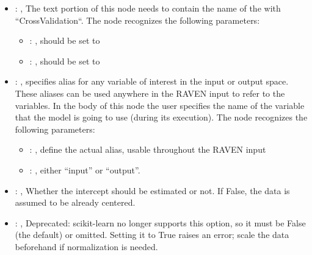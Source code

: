 \begin{itemize}
\begin{itemize}
        \item {}: ,
          List of IDs of features/variables to include in the transformation process.

        \item {}: ,
          Which space to search? Target or Feature?
      \end{itemize}

    \item {}: ,
      The text portion of this node needs to contain the name of the  with
               ``CrossValidation``.
      The  node recognizes the following parameters:
        \begin{itemize}
          \item {}: ,
            should be set to 
          \item {}: ,
            should be set to 
      \end{itemize}

    \item {}: ,
      specifies alias for         any variable of interest in the input or output space. These
      aliases can be used anywhere in the RAVEN input to         refer to the variables. In the body
      of this node the user specifies the name of the variable that the model is going to use
      (during its execution).
      The  node recognizes the following parameters:
        \begin{itemize}
          \item {}: ,
            define the actual alias, usable throughout the RAVEN input
          \item {}: ,
            either ``input'' or ``output''.
      \end{itemize}

    \item {}: ,
      Whether the intercept should be estimated or not. If False,
      the data is assumed to be already centered.

    \item {}: ,
      Deprecated: scikit-learn no longer supports this option, so it must be False (the default) or
      omitted.                                                  Setting it to True raises an error;
      scale the data beforehand if normalization is needed.


\end{itemize}
